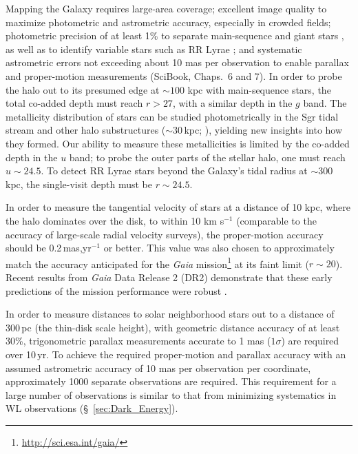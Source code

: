 Mapping the Galaxy requires large-area coverage; excellent image
quality to maximize photometric and astrometric accuracy,
especially in crowded fields; photometric precision of at least 1\% to
separate main-sequence and
giant stars \cite[e.g.,][]{2003ApJ...586..195H}, as well as to identify variable
stars such as RR Lyrae \citep{2010ApJ...708..717S,2011ApJ...728..106S};
and systematic astrometric errors not exceeding about 10 mas per observation to enable parallax and proper-motion measurements
(SciBook, Chaps.~6 and 7). In order to probe the halo out to its presumed edge at $\sim100$ kpc \citep{2004ASPC..327..104I}
with main-sequence stars, the total co-added depth must reach $r > 27$, with a similar depth in the $g$ band.
The metallicity distribution of stars can be studied photometrically in the Sgr tidal stream
\cite[see, e.g.,][]{2003ApJ...599.1082M,2007ApJ...670..346C} and other halo substructures
($\sim 30$\,kpc; \citealt{2007Natur.450.1020C}), yielding new insights into how
they formed.  Our ability to measure these metallicities is limited by
the co-added depth in the $u$ band; to probe the outer parts of the
stellar halo, one must reach
$u\sim24.5$. To detect RR Lyrae stars beyond the Galaxy's tidal radius at $\sim 300$ kpc, the single-visit depth must
be $r \sim  24.5$.

In order to measure the tangential velocity of stars at a distance of 10 kpc, where the halo dominates over the disk, to
within 10 km s$^{-1}$ (comparable to the accuracy of large-scale radial velocity surveys), the proper-motion
accuracy should be 0.2\,mas,yr$^{-1}$ or better. This value was also chosen to approximately match the accuracy
anticipated for the \textit{Gaia} mission\footnote{\url{http://sci.esa.int/gaia/}} \citep{2001A&A...369..339P,2012Ap&SS.341...31D}
at its faint limit ($r \sim 20$). Recent results from \textit{Gaia} Data Release 2 (DR2) demonstrate that
these early predictions of the mission performance were robust \citep{2018A&A...616A...1G,2018A&A...616A...2L}.

In order to measure distances to solar neighborhood stars out to a distance of 300\,pc (the thin-disk scale height),
with geometric distance accuracy of at least 30\%, trigonometric parallax measurements accurate to 1 mas ($1\sigma$)
are required over 10\,yr. To achieve the required proper-motion and parallax accuracy with an assumed astrometric
accuracy of 10 mas per observation per coordinate, approximately 1000
separate observations are required. This requirement for a large
number of observations is similar to that from minimizing
systematics in WL observations (\S~\ref{sec:Dark_Energy}).


